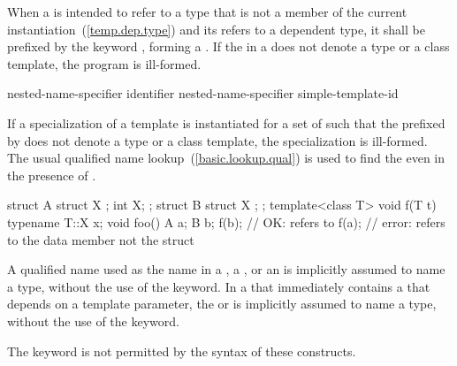 \pnum
When a  is intended to refer to a type
that is not a member of the current instantiation~(\ref{temp.dep.type})
and its 
refers to a dependent type,
it shall be
prefixed by the keyword , forming a
.
If the  in a 
does not denote a type
or a class template,
the program is ill-formed.

\begin{bnf}
\br
   nested-name-specifier identifier\br
   nested-name-specifier  simple-template-id
\end{bnf}

\pnum
If a specialization of a template is instantiated for a set of
such that the
prefixed by
does not denote a type
or a class template,
the specialization is ill-formed.
The usual qualified name lookup~(\ref{basic.lookup.qual}) is used to find the
even in the presence of
.
\begin{example}

\begin{codeblock}
struct A {
  struct X { };
  int X;
};
struct B {
  struct X { };
};
template<class T> void f(T t) {
  typename T::X x;
}
void foo() {
  A a;
  B b;
  f(b);             // OK:  refers to 
  f(a);             // error:  refers to the data member  not the struct 
}
\end{codeblock}
\end{example}

\pnum
A qualified name used as the name in a
,
a
,
or an
is implicitly assumed to name a type, without the use of the
keyword.
In a  that immediately contains a 
that depends on a template parameter, the  or 
is implicitly assumed to name a type, without the use of the  keyword.
\begin{note}
The
keyword is not permitted by the syntax of these constructs.
\end{note}

